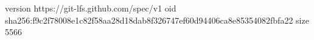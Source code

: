 version https://git-lfs.github.com/spec/v1
oid sha256:f9c2f78008e1c82f58aa28d18dab8f326747ef60d94406ca8e85354082fbfa22
size 5566
